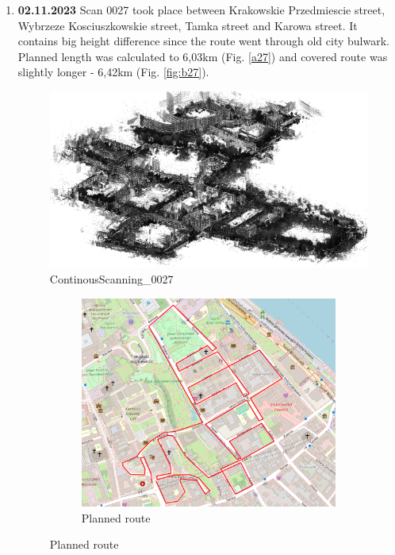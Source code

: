 \documentclass[a4paper,12pt]{book}
\begin{document}
\begin{enumerate}
	\item \textbf{02.11.2023} Scan 0027 took place between Krakowskie Przedmiescie street, Wybrzeze Kosciuszkowskie street, Tamka street and Karowa street. It contains big height difference since the route went through old city bulwark. Planned length was calculated to  6,03km (Fig. \ref{a27}) and covered route was slightly longer - 6,42km (Fig. \ref{fig:b27}).
	\begin{figure}[H]
		\includegraphics[width=1\linewidth]{cloud27}
		\caption{ContinousScanning\_0027}
	\end{figure}
	\begin{figure}[H]
		\centering
		\begin{subfigure}{.88\textwidth}
			\centering
			\includegraphics[width=1\linewidth]{route_p27}
			\caption{Planned route}
			\label{fig:a27}
		\end{subfigure}%

\end{figure}
\end{enumerate}
\end{document}

